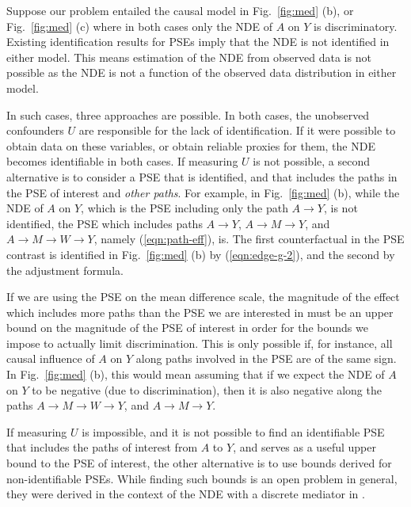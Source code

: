 \documentclass[letterpaper]{article} %
\newcommand{\citep}{\cite}
\begin{document}
Suppose our problem entailed the causal model in Fig.~\ref{fig:med} (b), or Fig.~\ref{fig:med} (c) where in both cases only the NDE of $A$ on $Y$ is discriminatory.  Existing identification results for PSEs \citep{shpitser13cogsci} imply that the NDE is not identified in either model.  This means estimation of the NDE from observed data is not possible as the NDE is not a function of the observed data distribution in either model.

In such cases, three approaches are possible.  In both cases, the unobserved confounders $U$ are responsible for the lack of identification.  If it were possible to obtain data on these variables, or obtain reliable proxies for them, the NDE becomes identifiable in both cases.  If measuring $U$ is not possible, a second alternative is to consider a PSE that is identified, and that includes the paths in the PSE of interest and \emph{other paths}.  For example, in Fig.~\ref{fig:med} (b), while the NDE of $A$ on $Y$, which is the PSE including only the path $A \to Y$, is not identified, the PSE which includes paths $A \to Y$, $A \to M \to Y$, and $A \to M \to W \to Y$, namely (\ref{eqn:path-eff}), is.
The first counterfactual in the PSE contrast is identified in Fig.~\ref{fig:med} (b) by (\ref{eqn:edge-g-2}), and the second by the adjustment formula.

If we are using the PSE on the mean difference scale, the magnitude of the effect which includes more paths than the PSE we are interested in must be an upper bound on the magnitude of the PSE of interest in order for the bounds we impose to actually limit discrimination.  This is only possible if, for instance, all causal influence of $A$ on $Y$ along paths involved in the PSE are of the same sign.  In Fig.~\ref{fig:med} (b), this would mean assuming that if we expect the NDE of $A$ on $Y$ to be negative (due to discrimination), then it is also negative along the paths $A \to M \to W \to Y$, and $A \to M \to Y$.

If measuring $U$ is impossible, and it is not possible to find an identifiable PSE that includes the paths of interest from $A$ to $Y$, and serves as a useful upper bound to the PSE of interest, the other alternative is to use bounds derived for non-identifiable PSEs.  While finding such bounds is an open problem in general, they were derived in the context of the NDE with a discrete mediator in \citep{caleb16on}. 
\end{document}
